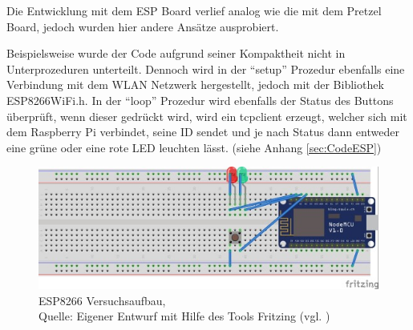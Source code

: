 Die Entwicklung mit dem ESP Board verlief analog wie die mit dem Pretzel Board, jedoch wurden hier andere Ansätze ausprobiert.

Beispielsweise wurde der Code aufgrund seiner Kompaktheit nicht in Unterprozeduren unterteilt.
Dennoch wird in der "`setup"' Prozedur ebenfalls eine Verbindung mit dem WLAN Netzwerk hergestellt, jedoch mit der Bibliothek ESP8266WiFi.h.
In der "`loop"' Prozedur wird ebenfalls der Status des Buttons überprüft, wenn dieser gedrückt wird, wird ein tcpclient erzeugt, welcher sich mit dem Raspberry Pi verbindet, seine ID sendet und je nach Status dann entweder eine grüne oder eine rote LED leuchten lässt.
(siehe Anhang \ref{sec:CodeESP})
\begin{figure}[H]
	\centering
	\includegraphics[scale=1.5]{ESP_Fritzing.jpg}
	\caption[ESP8266 Versuchsaufbau]{ESP8266 Versuchsaufbau,\\ Quelle: Eigener Entwurf mit Hilfe des Tools Fritzing (vgl. \cite{.fritz})}
\end{figure}